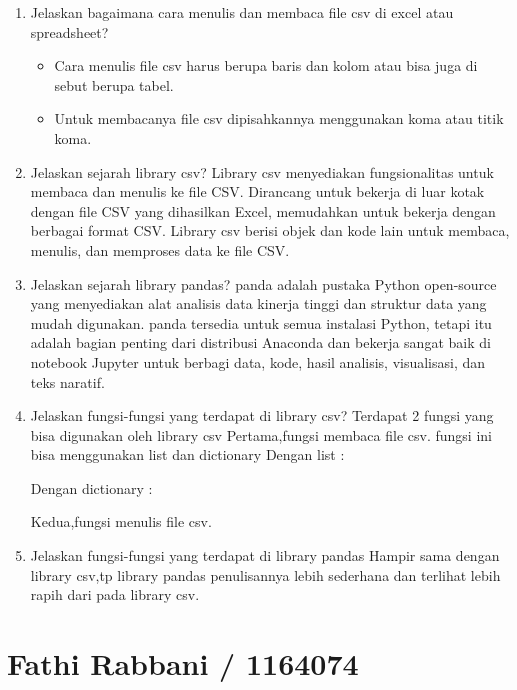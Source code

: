 \begin{enumerate}
    \item Jelaskan bagaimana cara menulis dan membaca file csv di excel atau spreadsheet?
	\begin{itemize}
        \item Cara menulis file csv harus berupa baris dan kolom atau bisa juga di sebut berupa tabel.
        \item Untuk membacanya file csv dipisahkannya menggunakan koma atau titik koma.
    \end{itemize}
    
    \item Jelaskan sejarah library csv?
	Library csv menyediakan fungsionalitas untuk membaca dan menulis ke file CSV. Dirancang untuk bekerja di luar kotak dengan file CSV yang dihasilkan Excel, memudahkan untuk bekerja dengan berbagai format CSV. Library csv berisi objek dan kode lain untuk membaca, menulis, dan memproses data ke file CSV.
    
    \item Jelaskan sejarah library pandas?
	panda adalah pustaka Python open-source yang menyediakan alat analisis data kinerja tinggi dan struktur data yang mudah digunakan. panda tersedia untuk semua instalasi Python, tetapi itu adalah bagian penting dari distribusi Anaconda dan bekerja sangat baik di notebook Jupyter untuk berbagi data, kode, hasil analisis, visualisasi, dan teks naratif.

    \item Jelaskan fungsi-fungsi yang terdapat di library csv?
	Terdapat 2 fungsi yang bisa digunakan oleh library csv
    Pertama,fungsi membaca file csv.
    fungsi ini bisa menggunakan list dan dictionary
    Dengan list :
    
    Dengan dictionary :
    
    Kedua,fungsi menulis file csv.
    
    
    \item Jelaskan fungsi-fungsi yang terdapat di library pandas
	Hampir sama dengan library csv,tp library pandas penulisannya lebih sederhana dan terlihat lebih rapih dari pada library csv.
    
    

\end{enumerate}

\section{Fathi Rabbani / 1164074}
